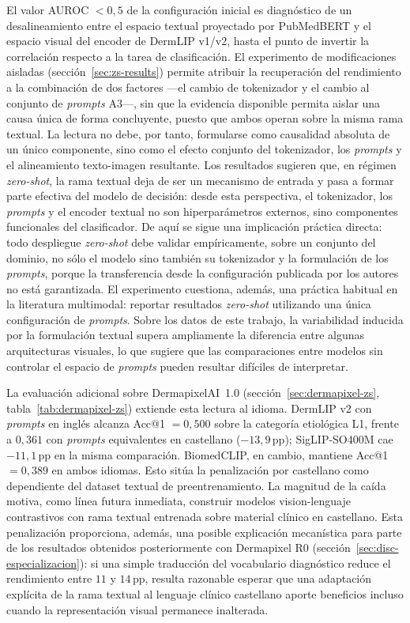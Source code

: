 El valor AUROC $<0{,}5$ de la configuración inicial es diagnóstico de un
desalineamiento entre el espacio textual proyectado por PubMedBERT y el
espacio visual del encoder de DermLIP v1/v2, hasta el punto de invertir la
correlación respecto a la tarea de clasificación. El experimento de
modificaciones aisladas (sección~\ref{sec:zs-results}) permite atribuir la
recuperación del rendimiento a la combinación de dos factores ---el cambio
de tokenizador y el cambio al conjunto de \emph{prompts} A3---, sin que la
evidencia disponible permita aislar una causa única de forma concluyente,
puesto que ambos operan sobre la misma rama textual. La lectura no debe,
por tanto, formularse como causalidad absoluta de un único componente,
sino como el efecto conjunto del tokenizador, los \emph{prompts} y el
alineamiento texto-imagen resultante. Los resultados sugieren que, en
régimen \emph{zero-shot}, la rama textual deja de ser un mecanismo de
entrada y pasa a formar parte efectiva del modelo de decisión: desde
esta perspectiva, el tokenizador, los \emph{prompts} y el encoder
textual no son hiperparámetros externos, sino componentes funcionales
del clasificador. De aquí se sigue una implicación práctica directa: todo despliegue \emph{zero-shot} debe validar
empíricamente, sobre un conjunto del dominio, no sólo el modelo sino
también su tokenizador y la formulación de los \emph{prompts}, porque la
transferencia desde la configuración publicada por los autores no está
garantizada. El experimento cuestiona, además, una práctica habitual en
la literatura multimodal: reportar resultados \emph{zero-shot} utilizando
una única configuración de \emph{prompts}. Sobre los datos de este
trabajo, la variabilidad inducida por la formulación textual supera
ampliamente la diferencia entre algunas arquitecturas visuales, lo que
sugiere que las comparaciones entre modelos sin controlar el espacio de
\emph{prompts} pueden resultar difíciles de interpretar.

La evaluación adicional sobre DermapixelAI~1.0
(sección~\ref{sec:dermapixel-zs}, tabla~\ref{tab:dermapixel-zs})
extiende esta lectura al idioma. DermLIP v2 con \emph{prompts} en
inglés alcanza Acc@1 $= 0{,}500$ sobre la categoría etiológica
L1, frente a $0{,}361$ con \emph{prompts} equivalentes en
castellano ($-13{,}9$\,pp); SigLIP-SO400M cae $-11{,}1$\,pp en
la misma comparación. BiomedCLIP, en cambio, mantiene Acc@1
$= 0{,}389$ en ambos idiomas. Esto sitúa la penalización por
castellano como dependiente del dataset textual de preentrenamiento.
La magnitud de la caída motiva, como línea futura inmediata,
construir modelos vision-lenguaje contrastivos con rama textual
entrenada sobre material clínico en castellano. Esta penalización
proporciona, además, una posible explicación mecanística para parte de
los resultados obtenidos posteriormente con Dermapixel R0
(sección~\ref{sec:disc-especializacion}): si una simple traducción del
vocabulario diagnóstico reduce el rendimiento entre $11$ y $14$\,pp,
resulta razonable esperar que una adaptación explícita de la rama
textual al lenguaje clínico castellano aporte beneficios incluso cuando
la representación visual permanece inalterada.

